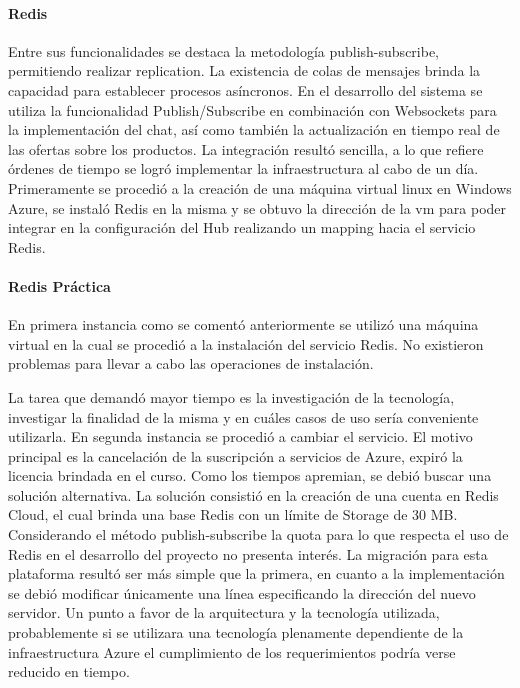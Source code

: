 \documentclass[journal]{IEEEtran}
\begin{document}
\paragraph{Redis}
Entre sus funcionalidades se destaca la metodología publish-subscribe, permitiendo realizar replication. La existencia de colas de mensajes brinda la capacidad para establecer procesos asíncronos.
En el desarrollo del sistema se utiliza la funcionalidad Publish/Subscribe en combinación con Websockets para la implementación del chat, así como también la actualización en tiempo real de las ofertas sobre los productos.
La integración resultó sencilla, a lo que refiere órdenes de tiempo se logró implementar la infraestructura al cabo de un día. Primeramente se procedió a la creación de una máquina virtual linux en Windows Azure, se instaló Redis en la misma y se obtuvo la dirección de la vm para poder integrar en la configuración del Hub realizando un mapping hacia el servicio Redis.

\paragraph{Redis Práctica}
En primera instancia como se comentó anteriormente se utilizó una máquina virtual en la cual se procedió a la instalación del servicio Redis. No existieron problemas para llevar a cabo las operaciones de instalación.

La tarea que demandó mayor tiempo es la investigación de la tecnología, investigar la finalidad de la misma y en cuáles casos de uso sería conveniente utilizarla.
En segunda instancia se procedió a cambiar el servicio. El motivo principal es la cancelación de la suscripción a servicios de Azure, expiró la licencia brindada en el curso.
Como los tiempos apremian, se debió buscar una solución alternativa. La solución consistió en la creación de una cuenta en Redis Cloud, el cual brinda una base Redis con un límite de Storage de 30 MB. Considerando el método publish-subscribe la quota para lo que respecta el uso de Redis en el desarrollo del proyecto no presenta interés.
La migración para esta plataforma resultó ser más simple que la primera, en cuanto a la implementación se debió modificar únicamente una línea especificando la dirección del nuevo servidor. Un punto a favor de la arquitectura y la tecnología utilizada, probablemente si se utilizara una tecnología plenamente dependiente de la infraestructura Azure el cumplimiento de los requerimientos podría verse reducido en tiempo.
\end{document}
